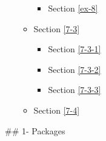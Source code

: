 \documentclass[11pt]{article}
\providecommand{\tightlist}{%
      \setlength{\itemsep}{0pt}\setlength{\parskip}{0pt}}
\begin{document}
\begin{itemize}
\begin{itemize}
    \begin{itemize}
    \tightlist
    \item
      Section \ref{ex-8}
    \end{itemize}
  \item
    Section \ref{7-3}

    \begin{itemize}
    \tightlist
    \item
      Section \ref{7-3-1}
    \item
      Section \ref{7-3-2}
    \item
      Section \ref{7-3-3}
    \end{itemize}
  \item
    Section \ref{7-4}
  \end{itemize}
\end{itemize}

    \#\# 1- Packages
\end{document}
